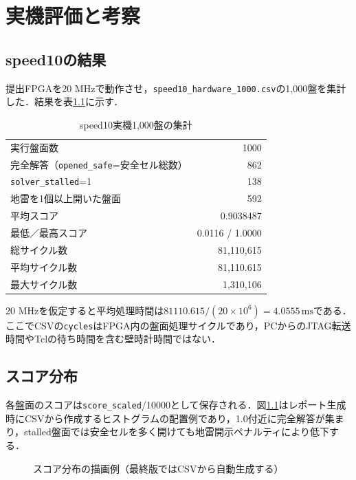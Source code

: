 \chapter{実機評価と考察}
\label{chap:results}

\section{speed10の結果}
提出FPGAを20 MHzで動作させ，\texttt{speed10\_hardware\_1000.csv}の1,000盤を集計した．結果を表\ref{tab:speed10}に示す．
\begin{table}[tb]
\centering
\caption{speed10実機1,000盤の集計}
\label{tab:speed10}
\begin{tabular}{l r}
実行盤面数&1000\\
完全解答（\texttt{opened\_safe}=安全セル総数）&862\\
\texttt{solver\_stalled}=1&138\\
地雷を1個以上開いた盤面&592\\
平均スコア&0.9038487\\
最低／最高スコア&0.0116 / 1.0000\\
総サイクル数&81,110,615\\
平均サイクル数&81,110.615\\
最大サイクル数&1,310,106\\
\end{tabular}
\end{table}

20 MHzを仮定すると平均処理時間は\(81110.615/(20\times10^6)=4.0555\,\mathrm{ms}\)である．ここでCSVの\texttt{cycles}はFPGA内の盤面処理サイクルであり，PCからのJTAG転送時間やTclの待ち時間を含む壁時計時間ではない．

\section{スコア分布}
各盤面のスコアは\texttt{score\_scaled}/10000として保存される．図\ref{fig:score-hist}はレポート生成時にCSVから作成するヒストグラムの配置例であり，1.0付近に完全解答が集まり，stalled盤面では安全セルを多く開けても地雷開示ペナルティにより低下する．
\begin{figure}[tb]
\centering
{}
\caption{スコア分布の描画例（最終版ではCSVから自動生成する）}
\label{fig:score-hist}
\end{figure}

